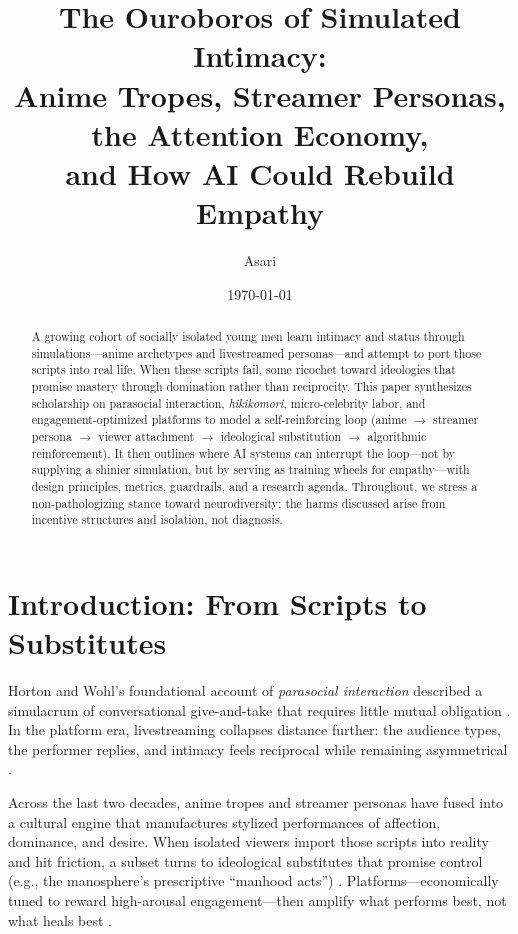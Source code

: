 \documentclass[12pt]{article}
\title{The Ouroboros of Simulated Intimacy:\\
Anime Tropes, Streamer Personas, the Attention Economy,\\
and How AI Could Rebuild Empathy}
\author{Asari}
\date{\today}
\begin{document}
\maketitle

\begin{abstract}
A growing cohort of socially isolated young men learn intimacy and status through simulations---anime archetypes and livestreamed personas---and attempt to port those scripts into real life. When these scripts fail, some ricochet toward ideologies that promise mastery through domination rather than reciprocity. This paper synthesizes scholarship on parasocial interaction, \emph{hikikomori}, micro-celebrity labor, and engagement-optimized platforms to model a self-reinforcing loop (anime $\rightarrow$ streamer persona $\rightarrow$ viewer attachment $\rightarrow$ ideological substitution $\rightarrow$ algorithmic reinforcement). It then outlines where AI systems can interrupt the loop---not by supplying a shinier simulation, but by serving as training wheels for empathy---with design principles, metrics, guardrails, and a research agenda. Throughout, we stress a non-pathologizing stance toward neurodiversity: the harms discussed arise from incentive structures and isolation, not diagnosis.
\end{abstract}

\section{Introduction: From Scripts to Substitutes}

Horton and Wohl's foundational account of \emph{parasocial interaction} described a simulacrum of conversational give-and-take that requires little mutual obligation \cite{horton1956}. In the platform era, livestreaming collapses distance further: the audience types, the performer replies, and intimacy feels reciprocal while remaining asymmetrical \cite{taylor2018}.

Across the last two decades, anime tropes and streamer personas have fused into a cultural engine that manufactures stylized performances of affection, dominance, and desire. When isolated viewers import those scripts into reality and hit friction, a subset turns to ideological substitutes that promise control (e.g., the manosphere's prescriptive ``manhood acts'') \cite{ging2019}. Platforms---economically tuned to reward high-arousal engagement---then amplify what performs best, not what heals best \cite{berger2012,zuboff2019,wu2016}.
\end{document}

